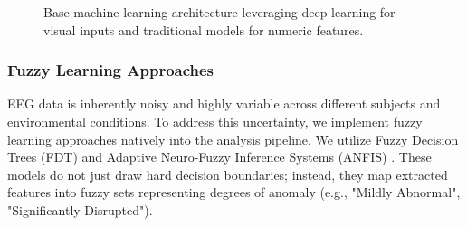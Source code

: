 \documentclass[openany]{book}
\begin{document}
\begin{figure}[htpb]
    \centering
    \caption{Base machine learning architecture leveraging deep learning for visual inputs and traditional models for numeric features.}
    \label{fig:ml_analysis_base}
\end{figure}

\subsubsection{Fuzzy Learning Approaches}
EEG data is inherently noisy and highly variable across different subjects and environmental conditions. To address this uncertainty, we implement fuzzy learning approaches natively into the analysis pipeline. We utilize Fuzzy Decision Trees (FDT) and Adaptive Neuro-Fuzzy Inference Systems (ANFIS) \cite{jang1993anfis}. These models do not just draw hard decision boundaries; instead, they map extracted features into fuzzy sets representing degrees of anomaly (e.g., "Mildly Abnormal", "Significantly Disrupted").
\end{document}
